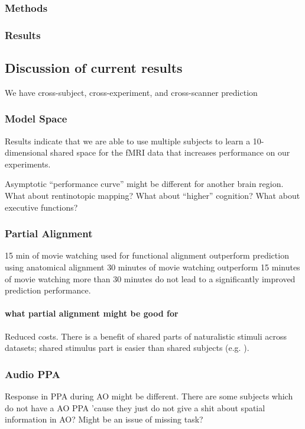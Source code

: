 \subsubsection{Methods}

\subsubsection{Results}


\subsection{Discussion of current results}


We have cross-subject, cross-experiment, and cross-scanner prediction


\subsubsection{Model Space}
%
Results indicate that we are able to use multiple subjects to learn a
10-dimensional shared space for the fMRI data that increases performance on our
experiments.

%
Asymptotic ``performance curve'' might be different for another brain region.
%
What about rentinotopic mapping?
%
What about ``higher'' cognition?
%
What about executive functions?


\subsubsection{Partial Alignment}
%
15 min of movie watching used for functional alignment outperform prediction
using anatomical alignment
%
30 minutes of movie watching outperform 15 minutes of movie watching
%
more than 30 minutes do not lead to a significantly improved prediction
performance.


\paragraph{what partial alignment might be good for}
%
Reduced costs.
%
There is a benefit of shared parts of naturalistic stimuli across datasets;
shared stimulus part is easier than shared subjects (e.g.
\citep{zhang2018transfer}).


\subsubsection{Audio PPA}

%
Response in PPA during AO might be different.
%
There are some subjects which do not have a AO PPA 'cause they just do not give
a shit about spatial information in AO? Might be an issue of missing task?


